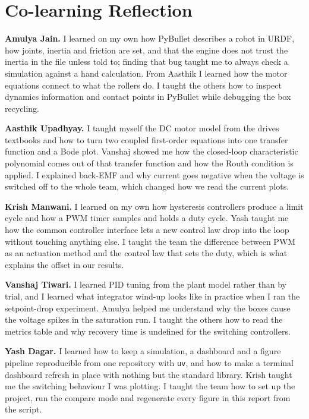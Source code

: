 \documentclass[12pt,a4paper]{article}
\begin{document}
\section{Co-learning Reflection}


\textbf{Amulya Jain.} I learned on my own how PyBullet describes a robot in URDF, how joints, inertia and friction are set, and that the engine does not trust the inertia in the file unless told to; finding that bug taught me to always check a simulation against a hand calculation. From Aasthik I learned how the motor equations connect to what the rollers do. I taught the others how to inspect dynamics information and contact points in PyBullet while debugging the box recycling.

\textbf{Aasthik Upadhyay.} I taught myself the DC motor model from the drives textbooks and how to turn two coupled first-order equations into one transfer function and a Bode plot. Vanshaj showed me how the closed-loop characteristic polynomial comes out of that transfer function and how the Routh condition is applied. I explained back-EMF and why current goes negative when the voltage is switched off to the whole team, which changed how we read the current plots.

\textbf{Krish Manwani.} I learned on my own how hysteresis controllers produce a limit cycle and how a PWM timer samples and holds a duty cycle. Yash taught me how the common controller interface lets a new control law drop into the loop without touching anything else. I taught the team the difference between PWM as an actuation method and the control law that sets the duty, which is what explains the offset in our results.

\textbf{Vanshaj Tiwari.} I learned PID tuning from the plant model rather than by trial, and I learned what integrator wind-up looks like in practice when I ran the setpoint-drop experiment. Amulya helped me understand why the boxes cause the voltage spikes in the saturation run. I taught the others how to read the metrics table and why recovery time is undefined for the switching controllers.

\textbf{Yash Dagar.} I learned how to keep a simulation, a dashboard and a figure pipeline reproducible from one repository with \texttt{uv}, and how to make a terminal dashboard refresh in place with nothing but the standard library. Krish taught me the switching behaviour I was plotting. I taught the team how to set up the project, run the compare mode and regenerate every figure in this report from the script.
\end{document}
